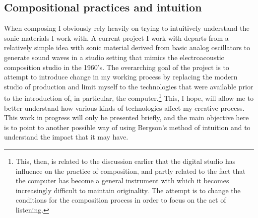 \documentclass[11pt]{article}
\begin{document}
\subsection*{Compositional practices and intuition}
\label{sec:orgc2e6ffa}
When composing I obviously rely heavily on trying to intuitively understand the sonic materials I work with.
A current project I work with departs from a relatively simple idea with sonic material derived from basic analog oscillators to generate sound waves in a studio setting that mimics the electroacoustic composition studio in the 1960's.
The overarching goal of the project is to attempt to introduce change in my working process by replacing the modern studio of production and limit myself to the technologies that were available prior to the introduction of, in particular, the computer.\footnote{This, then, is related to the discussion earlier that the digital studio has influence on the practice of composition, and partly related to the fact that the computer has become a general instrument with which it becomes increasingly difficult to maintain originality. The attempt is to change the conditions for the composition process in order to focus on the act of listening.}
This, I hope, will allow me to better understand how various kinds of technologies affect my creative process.
This work in progress will only be presented briefly, and the main objective here is to point to another possible way of using Bergson's method of intuition and to understand the impact that it may have.
\end{document}

